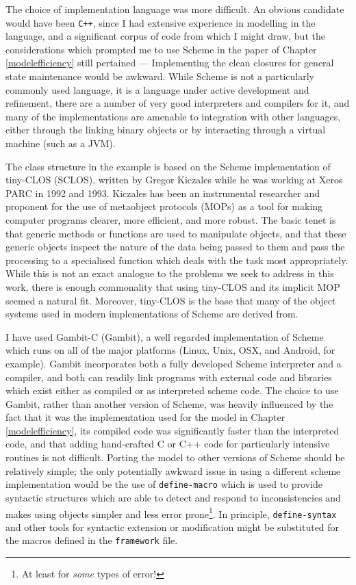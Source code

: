 The choice of implementation language was more difficult.  An obvious
candidate would have been \texttt{C++}, since I had extensive
experience in modelling in the language, and a significant corpus of
code from which I might draw, but the considerations which prompted me
to use Scheme in the paper of Chapter \ref{modelefficiency} still
pertained --- Implementing the clean closures for general state
maintenance would be awkward. While Scheme is not a particularly
commonly used language, it is a language under active development and
refinement, there are a number of very good interpreters and compilers
for it, and many of the implementations are amenable to integration
with other languages, either through the linking binary objects or by
interacting through a virtual machine (such as a JVM). 

The class structure in the example is based on the Scheme
implementation of tiny-CLOS (SCLOS), written by Gregor Kiczales
\cite{kiczales1993xerox} while he was working at Xeros PARC in 1992
and 1993.  Kiczales has been an instrumental researcher and proponent
for the use of metaobject protocols (MOPs) as a tool for making
computer programs clearer, more efficient, and more robust.  The basic
tenet is that generic methods or functions are used to manipulate
objects, and that these generic objects inspect the nature of the data
being passed to them and pass the processing to a specialised function
which deals with the task most appropriately.  While this is not an
exact analogue to the problems we seek to address in this work, there
is enough commonality that using tiny-CLOS and its implicit MOP seemed
a natural fit.  Moreover, tiny-CLOS is the base that many of the
object systems used in modern implementations of Scheme are derived
from.

I have used Gambit-C (Gambit), a well regarded implementation of
Scheme which runs on all of the major platforms (Linux, Unix, OSX, and
Android, for example). Gambit incorporates both a fully developed
Scheme interpreter and a compiler, and both can readily link programs
with external code and libraries which exist either as compiled or as
interpreted scheme code. The choice to use Gambit, rather than another
version of Scheme, was heavily influenced by the fact that it was the
implementation used for the model in Chapter \ref{modelefficiency},
its compiled code was significantly faster than the interpreted code,
and that adding hand-crafted C or C++ code for particularly intensive
routines is not difficult.  Porting the model to other versions of
Scheme should be relatively simple; the only potentially awkward issue
in using a different scheme implementation would be the use of
\texttt{define-macro} which is used to provide syntactic structures
which are able to detect and respond to inconsistencies and makes
using objects simpler and less error prone\footnote{At least for
  \emph{some} types of error!}.  In principle, \texttt{define-syntax}
and other tools for syntactic extension or modification might be
substituted for the macros defined in the \texttt{framework} file. 

